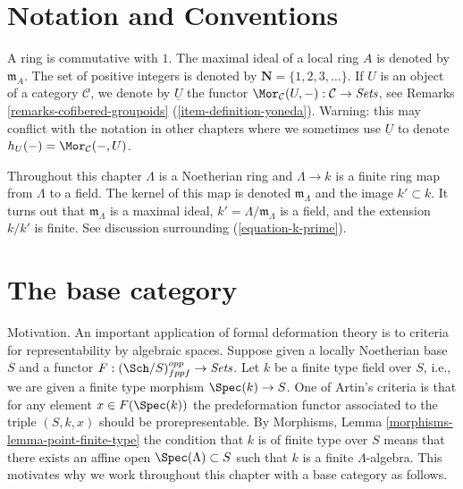 \section{Notation and Conventions}
\label{formal-defos-section-notations-conventions}
A ring is commutative with $1$. The  maximal ideal of a local ring $A$
is denoted by $\mathfrak{m}_A$. The set of positive integers is denoted
by $\mathbf{N} = \{1, 2, 3, \ldots\}$. If $U$ is an object of a
category $\mathcal{C}$, we denote by $\underline{U}$
the functor
$\Mor_\mathcal{C}(U, -): \mathcal{C} \to \textit{Sets}$, see
Remarks \ref{remarks-cofibered-groupoids} (\ref{item-definition-yoneda}).
Warning: this may conflict with the notation in other chapters where we
sometimes use $\underline{U}$ to denote $h_U(-) = \Mor_\mathcal{C}(-, U)$.

\medskip\noindent
Throughout this chapter $\Lambda$ is a Noetherian ring and
$\Lambda \to k$ is a finite ring map from $\Lambda$ to a field.
The kernel of this map is denoted $\mathfrak m_\Lambda$ and the
image $k' \subset k$. It turns out that $\mathfrak m_\Lambda$ is
a maximal ideal, $k' = \Lambda/\mathfrak m_\Lambda$ is a field, and
the extension $k/k'$ is finite. See discussion surrounding
(\ref{equation-k-prime}).

\section{The base category}
\label{formal-defos-section-CLambda}
Motivation. An important application of formal deformation theory is
to criteria for representability by algebraic spaces. Suppose given a
locally Noetherian base $S$ and a functor
$F : (\Sch/S)_{fppf}^{opp} \to \textit{Sets}$.
Let $k$ be a finite type field over $S$, i.e., we are given a
finite type morphism $\Spec(k) \to S$.
One of Artin's criteria is that for any element $x \in F(\Spec(k))$
the predeformation functor associated to
the triple $(S, k, x)$ should be prorepresentable. By
Morphisms, Lemma \ref{morphisms-lemma-point-finite-type}
the condition that $k$ is of finite type over $S$ means that there exists
an affine open $\Spec(\Lambda) \subset S$ such that $k$
is a finite $\Lambda$-algebra. This motivates why we work throughout
this chapter with a base category as follows.

